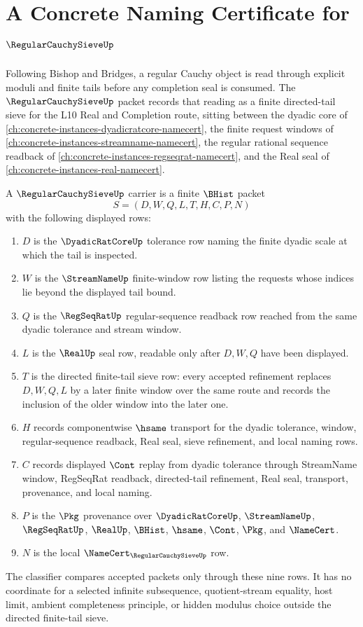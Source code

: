 \chapter{A Concrete Naming Certificate for $\RegularCauchySieveUp$}
\label{ch:concrete-instances-regular-cauchy-sieve-namecert}

Following Bishop and Bridges, a regular Cauchy object is read through explicit moduli and finite tails before any completion seal is consumed. The $\RegularCauchySieveUp$ packet records that reading as a finite directed-tail sieve for the L10 Real and Completion route, sitting between the dyadic core of \autoref{ch:concrete-instances-dyadicratcore-namecert}, the finite request windows of \autoref{ch:concrete-instances-streamname-namecert}, the regular rational sequence readback of \autoref{ch:concrete-instances-regseqrat-namecert}, and the Real seal of \autoref{ch:concrete-instances-real-namecert}.

\begin{definition}
\label{def:regular-cauchy-sieve-carrier}
A $\RegularCauchySieveUp$ carrier is a finite $\BHist$ packet
$$
S=(D,W,Q,L,T,H,C,P,N)
$$
with the following displayed rows:
\begin{enumerate}
\item $D$ is the $\DyadicRatCoreUp$ tolerance row naming the finite dyadic scale at which the tail is inspected.
\item $W$ is the $\StreamNameUp$ finite-window row listing the requests whose indices lie beyond the displayed tail bound.
\item $Q$ is the $\RegSeqRatUp$ regular-sequence readback row reached from the same dyadic tolerance and stream window.
\item $L$ is the $\RealUp$ seal row, readable only after $D,W,Q$ have been displayed.
\item $T$ is the directed finite-tail sieve row: every accepted refinement replaces $D,W,Q,L$ by a later finite window over the same route and records the inclusion of the older window into the later one.
\item $H$ records componentwise $\hsame$ transport for the dyadic tolerance, window, regular-sequence readback, Real seal, sieve refinement, and local naming rows.
\item $C$ records displayed $\Cont$ replay from dyadic tolerance through StreamName window, RegSeqRat readback, directed-tail refinement, Real seal, transport, provenance, and local naming.
\item $P$ is the $\Pkg$ provenance over $\DyadicRatCoreUp$, $\StreamNameUp$, $\RegSeqRatUp$, $\RealUp$, $\BHist$, $\hsame$, $\Cont$, $\Pkg$, and $\NameCert$.
\item $N$ is the local $\NameCert_{\RegularCauchySieveUp}$ row.
\end{enumerate}
The classifier compares accepted packets only through these nine rows. It has no coordinate for a selected infinite subsequence, quotient-stream equality, host limit, ambient completeness principle, or hidden modulus choice outside the directed finite-tail sieve.
\end{definition}

